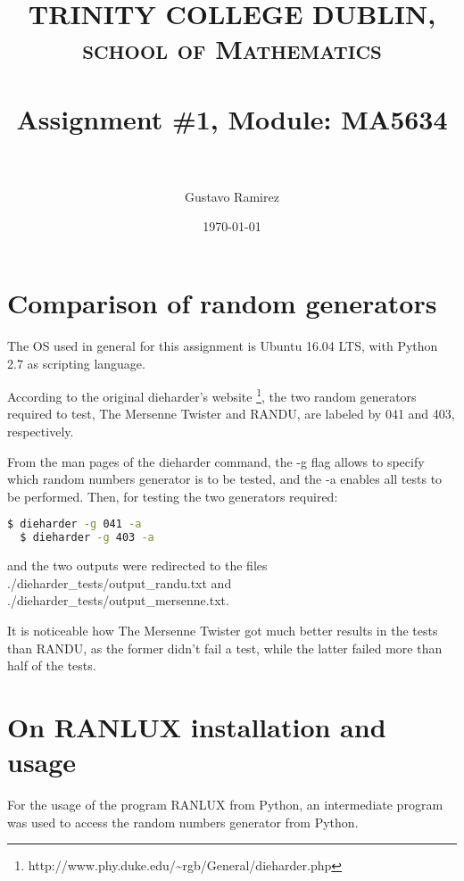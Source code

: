 \documentclass[paper=a4, fontsize=11pt]{scrartcl} %
\title{	
\normalfont \normalsize 
\textsc{TRINITY COLLEGE DUBLIN, school of Mathematics} \\ [25pt] %
\horrule{0.5pt} \\[0.4cm] %
\huge Assignment \#1, Module: MA5634 \\ %
\horrule{2pt} \\[0.5cm] %
}
\author{Gustavo Ramirez} %
\date{\normalsize\today} %
\numberwithin{equation}{section} %
\numberwithin{figure}{section} %
\numberwithin{table}{section} %
\begin{document}
\maketitle %



\section{Comparison of random generators}

The OS used in general for this assignment is Ubuntu 16.04 LTS, with Python 2.7 as scripting language.

According to the original dieharder's website \footnote{http://www.phy.duke.edu/\textasciitilde rgb/General/dieharder.php}, the two random generators required to test, The Mersenne Twister and RANDU, are labeled by 041 and 403, respectively.

From the man pages of the dieharder command, the -g flag allows to specify which random numbers generator is to be tested, and the -a enables all tests to be performed. Then, for testing the two generators required:

\begin{lstlisting}[language=bash]
  $ dieharder -g 041 -a
  $ dieharder -g 403 -a
\end{lstlisting}

and the two outputs were redirected to the files ./dieharder\_tests/output\_randu.txt and \\ ./dieharder\_tests/output\_mersenne.txt.

It is noticeable how The Mersenne Twister got much better results in the tests than RANDU, as the former didn't fail a test, while the latter failed more than half of the tests.



\section{On RANLUX installation and usage}


For the usage of the program RANLUX from Python, an intermediate program was used to access the random numbers generator from Python.
\end{document}
